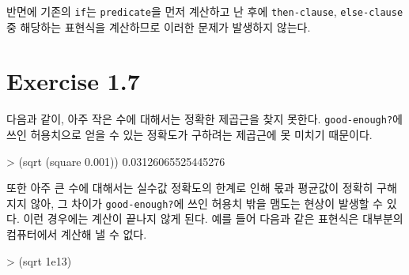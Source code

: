 반면에 기존의 \texttt{if}는 \texttt{predicate}을 먼저 계산하고 난 후에
\texttt{then-clause}, \texttt{else-clause} 중 해당하는 표현식을 계산하므로
이러한 문제가 발생하지 않는다.

\section{Exercise 1.7}

다음과 같이, 아주 작은 수에 대해서는 정확한 제곱근을 찾지
못한다. \texttt{good-enough?}에 쓰인 허용치으로 얻을 수 있는 정확도가
구하려는 제곱근에 못 미치기 때문이다.

\begin{lisp}
> (sqrt (square 0.001))
0.03126065525445276
\end{lisp}

또한 아주 큰 수에 대해서는 실수값 정확도의 한계로 인해 몫과 평균값이 정확히
구해지지 않아, 그 차이가 \texttt{good-enough?}에 쓰인 허용치 밖을 맴도는
현상이 발생할 수 있다. 이런 경우에는 계산이 끝나지 않게 된다. 예를 들어 다음과
같은 표현식은 대부분의 컴퓨터에서 계산해 낼 수 없다.

\begin{lisp}
> (sqrt 1e13)
\end{lisp}



